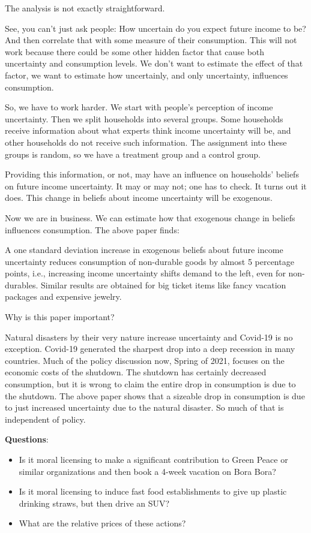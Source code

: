 \documentclass[
]{book}
\providecommand{\tightlist}{%
  \setlength{\itemsep}{0pt}\setlength{\parskip}{0pt}}
\begin{document}
The analysis is not exactly straightforward.

See, you can't just ask people: How uncertain do you expect future income to be? And then correlate that with some measure of their consumption. This will not work because there could be some other hidden factor that cause both uncertainty and consumption levels. We don't want to estimate the effect of that factor, we want to estimate how uncertainly, and only uncertainty, influences consumption.

So, we have to work harder. We start with people's perception of income uncertainty. Then we split households into several groups. Some households receive information about what experts think income uncertainty will be, and other households do not receive such information. The assignment into these groups is random, so we have a treatment group and a control group.

Providing this information, or not, may have an influence on households' beliefs on future income uncertainty. It may or may not; one has to check. It turns out it does. This change in beliefs about income uncertainty will be exogenous.

Now we are in business. We can estimate how that exogenous change in beliefs influences consumption. The above paper finds:

A one standard deviation increase in exogenous beliefs about future income uncertainty reduces consumption of non-durable goods by almost 5 percentage points, i.e., increasing income uncertainty shifts demand to the left, even for non-durables. Similar results are obtained for big ticket items like fancy vacation packages and expensive jewelry.

Why is this paper important?

Natural disasters by their very nature increase uncertainty and Covid-19 is no exception. Covid-19 generated the sharpest drop into a deep recession in many countries. Much of the policy discussion now, Spring of 2021, focuses on the economic costs of the shutdown. The shutdown has certainly decreased consumption, but it is wrong to claim the entire drop in consumption is due to the shutdown. The above paper shows that a sizeable drop in consumption is due to just increased uncertainty due to the natural disaster. So much of that is independent of policy.

\textbf{Questions}:

\begin{itemize}
\tightlist
\item
  Is it moral licensing to make a significant contribution to Green Peace or similar organizations and then book a 4-week vacation on Bora Bora?
\item
  Is it moral licensing to induce fast food establishments to give up plastic drinking straws, but then drive an SUV?
\item
  What are the relative prices of these actions?
\end{itemize}
\end{document}

